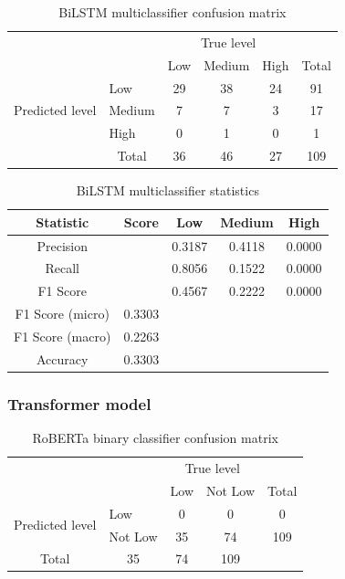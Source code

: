 \documentclass[12pt, a4paper]{article}
\begin{document}
\begin{table}[ht]
\centering
\begin{tabular}{l|l|c|c|c|c}
\multicolumn{2}{c}{}&\multicolumn{3}{c}{True level}&\\
\cline{3-5}
\multicolumn{2}{c|}{}&Low&Medium&High&\multicolumn{1}{c}{Total}\\
\cline{2-5}
\multirow{3}{*}{Predicted level}& Low & 29 & 38 & 24 & 91\\
\cline{2-5}
& Medium & 7 & 7 & 3 & 17\\
\cline{2-5}
& High & 0 & 1 & 0 & 1\\
\cline{2-5}
\multicolumn{1}{c}{} & \multicolumn{1}{c}{Total} & \multicolumn{1}{c}{36} & \multicolumn{    1}{c}{46} & \multicolumn{    1}{c}{27} & \multicolumn{1}{c}{109}\\
\end{tabular}

\caption{BiLSTM multiclassifier confusion matrix}
\label{table:bilstm}
\end{table}

\begin{table}[ht]
\centering
\begin{tabular}{||c c c c c||} 
 \hline
 Statistic & Score & Low & Medium & High  \\ [0.5ex] 
 \hline\hline
 Precision &  & 0.3187 & 0.4118 & 0.0000 \\ 
 Recall & & 0.8056 & 0.1522  & 0.0000\\
 F1 Score &  & 0.4567 & 0.2222  & 0.0000\\
 F1 Score (micro) & 0.3303 & & & \\
 F1 Score (macro)  & 0.2263 & & & \\ 
 Accuracy  & 0.3303 & & & \\ [1ex] 
 \hline
\end{tabular}
\caption{BiLSTM multiclassifier statistics}
\label{table:bilstmstat}
\end{table}

\subsubsection{Transformer model}

\begin{table}[ht]
\centering
\begin{tabular}{l|l|c|c|c}
\multicolumn{2}{c}{}&\multicolumn{2}{c}{True level}&\\
\cline{3-4}
\multicolumn{2}{c|}{}&Low&Not Low&\multicolumn{1}{c}{Total}\\
\cline{2-4}
\multirow{2}{*}{Predicted level}& Low & 0 & 0 & 0\\
\cline{2-4}
& Not Low & 35 & 74 & 109\\
\cline{2-4}
\multicolumn{1}{c}{Total} & \multicolumn{1}{c}{35} & \multicolumn{    1}{c}{74} & \multicolumn{1}{c}{109}\\
\end{tabular}
\caption{RoBERTa binary classifier confusion matrix}
\label{table:robertacm_low}
\end{table}
\end{document}
